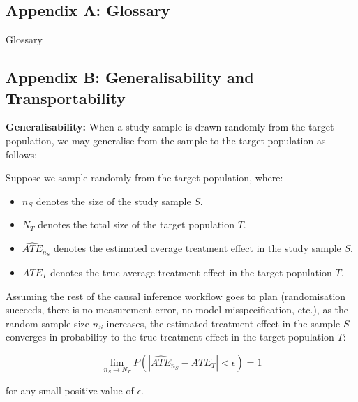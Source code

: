 \documentclass[
  single column]{article}
\providecommand{\tightlist}{%
  \setlength{\itemsep}{0pt}\setlength{\parskip}{0pt}}\usepackage{longtable,booktabs,array}
\begin{document}
\newpage{}

\subsection{Appendix A: Glossary}\label{id-app-a}

\begin{table}

\caption{\label{tbl-experiments}Glossary}

\centering{

\glossaryTerms

}

\end{table}%

\newpage{}

\subsection{Appendix B: Generalisability and
Transportability}\label{id-app-b}

\textbf{Generalisability:} When a study sample is drawn randomly from
the target population, we may generalise from the sample to the target
population as follows:

Suppose we sample randomly from the target population, where:

\begin{itemize}
\tightlist
\item
  \(n_S\) denotes the size of the study sample \(S\).
\item
  \(N_T\) denotes the total size of the target population \(T\).
\item
  \(\widehat{ATE}_{n_S}\) denotes the estimated average treatment effect
  in the study sample \(S\).
\item
  \(ATE_{T}\) denotes the true average treatment effect in the target
  population \(T\).
\end{itemize}

Assuming the rest of the causal inference workflow goes to plan
(randomisation succeeds, there is no measurement error, no model
misspecification, etc.), as the random sample size \(n_S\) increases,
the estimated treatment effect in the sample \(S\) converges in
probability to the true treatment effect in the target population \(T\):

\[
\lim_{n_S \to N_T} P(|\widehat{ATE}_{n_S} - ATE_{T}| < \epsilon) = 1
\]

for any small positive value of \(\epsilon\).
\end{document}

